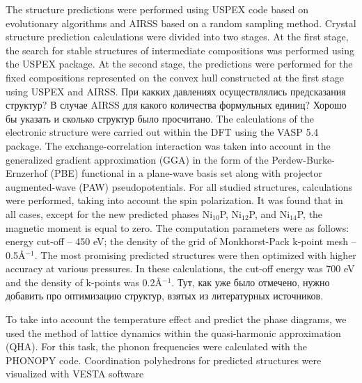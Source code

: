 \documentclass[twoside,twocolumn,9pt]{article}
\begin{document}
The structure predictions were performed using USPEX code based on evolutionary algorithms \cite{USPEX-GLASS2006713, USPEX-OGANOV-2006, USPEX-LYAKHOV-2010-1623} and AIRSS based on
a random sampling method.\cite{AIRSS-PhysRevLett.97.045504, AIRSS-Pickard_2011} 
Crystal structure prediction calculations were divided into two stages. At the first stage, the search for stable structures of intermediate compositions was performed using the USPEX package. 
At the second stage, the predictions were performed for the fixed compositions represented on the convex hull constructed at the first stage using USPEX and AIRSS.
При какких давлениях осуществлялись предсказания структур? В случае AIRSS для какого количества формульных единиц? Хорошо бы указать и сколько структур было просчитано.
The calculations of the electronic structure were carried out within the DFT using the VASP 5.4 package.\cite{VASP-1-PhysRevB.59.1758, VASP-2-PhysRevB.54.11169}
The exchange-correlation interaction was taken into account in the generalized  gradient approximation (GGA) in the form of the Perdew-Burke-Ernzerhof (PBE) functional \cite{PBE-PhysRevLett.78.1396} in a plane-wave basis set along with projector augmented-wave (PAW) pseudopotentials.\cite{PAW-PhysRevB.50.17953} 
For all studied structures, calculations were performed, taking into account the spin polarization. It was found that in all cases, except for the new predicted phases Ni$_{10}$P, Ni$_{12}$P, and Ni$_{14}$P, the magnetic moment is equal to zero. 
The computation parameters were as follows: energy cut-off -- 450 eV; the density of the grid of Monkhorst-Pack k-point mesh -- 0.5\AA$^{-1}$. 
The most promising predicted structures were then optimized with higher accuracy at various pressures. 
In these calculations, the cut-off energy was 700 eV and the density of k-points was 0.2\AA$^{-1}$. 
Тут, как уже было отмечено, нужно добавить про оптимизацию структур, взятых из литературных источников.

To take into account the temperature effect and predict the phase diagrams, we used the method of lattice dynamics within the quasi-harmonic approximation (QHA). 
For this task, the phonon frequencies were calculated with the PHONOPY code.\cite{phonopy}
{
\color{blue} Coordination polyhedrons for predicted structures were visualized with VESTA software~\cite{Momma:VESTA}
}


\end{document}
